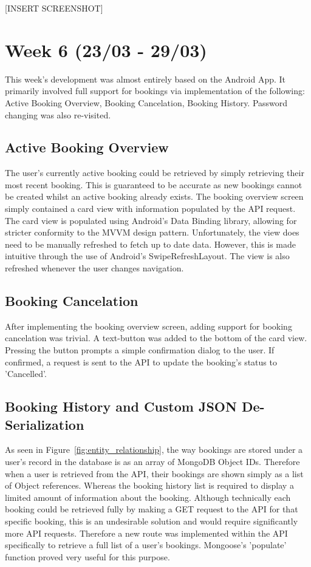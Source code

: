 [INSERT SCREENSHOT]

\section{Week 6 (23/03 - 29/03)}
This week's development was almost entirely based on the Android App. It primarily involved full support for bookings via implementation of the following: Active Booking Overview, Booking Cancelation, Booking History. Password changing was also re-visited.

\subsection{Active Booking Overview}
The user's currently active booking could be retrieved by simply retrieving their most recent booking. This is guaranteed to be accurate as new bookings cannot be created whilst an active booking already exists. The booking overview screen simply contained a card view with information populated by the API request. The card view is populated using Android's Data Binding library, allowing for stricter conformity to the MVVM design pattern.  Unfortunately, the view does need to be manually refreshed to fetch up to date data. However, this is made intuitive through the use of Android's SwipeRefreshLayout. The view is also refreshed whenever the user changes navigation.

\subsection{Booking Cancelation}
After implementing the booking overview screen, adding support for booking cancelation was trivial. A text-button was added to the bottom of the card view. Pressing the button prompts a simple confirmation dialog to the user. If confirmed, a request is sent to the API to update the booking's status to 'Cancelled'.

\subsection{Booking History and Custom JSON De-Serialization}
As seen in Figure~\ref{fig:entity_relationship}, the way bookings are stored under a user's record in the database is as an array of MongoDB Object IDs. Therefore when a user is retrieved from the API, their bookings are shown simply as a list of Object references. Whereas the booking history list is required to display a limited amount of information about the booking. Although technically each booking could be retrieved fully by making a GET request to the API for that specific booking, this is an undesirable solution and would require significantly more API requests. Therefore a new route was implemented within the API specifically to retrieve a full list of a user's bookings. Mongoose's 'populate' function proved very useful for this purpose. 

